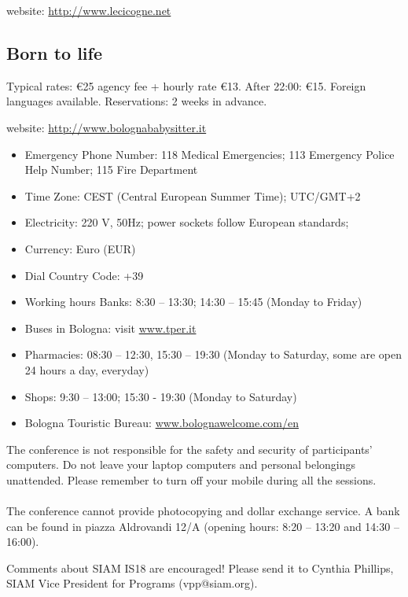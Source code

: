 \smallskip\noindent website: \href{http://www.lecicogne.net}{http://www.lecicogne.net}

\subsection*{Born to life}
Typical rates: \euro 25 agency fee + hourly rate \euro 13. After 22:00: \euro 15. Foreign languages available. Reservations: 2 weeks in advance.

\smallskip\noindent website: \href{http://www.bolognababysitter.it}{http://www.bolognababysitter.it}


\begin{itemize}
  \item Emergency Phone Number: 118 Medical Emergencies; 113 Emergency Police Help Number; 115 Fire Department 
  \item Time Zone: CEST (Central European Summer Time); UTC/GMT+2
  \item Electricity: 220 V, 50Hz; power sockets follow European standards;
  \item Currency: Euro (EUR)
  \item Dial Country Code: +39
  \item Working hours Banks: 8:30 -- 13:30; 14:30 -- 15:45 (Monday to Friday) 
  \item Buses in Bologna: visit \href{https://www.tper.it/ }{www.tper.it}
  \item Pharmacies: 08:30 -- 12:30, 15:30 -- 19:30 (Monday to Saturday, some are open 24 hours a day, everyday) 
  \item Shops: 9:30 -- 13:00; 15:30 - 19:30 (Monday to Saturday) 
  \item Bologna Touristic Bureau: \href{https://www.bolognawelcome.com/en}{www.bolognawelcome.com/en}
\end{itemize}

The conference is not responsible for the safety and security of participants' computers. 
Do not leave your laptop computers and personal belongings unattended. 
Please remember to turn off your mobile during all the sessions.\\\\ 
The conference cannot provide photocopying and dollar exchange service. 
A bank can be found in piazza Aldrovandi 12/A (opening hours: 8:20 -- 13:20 and 14:30 -- 16:00).

Comments about SIAM IS18 are encouraged! Please send it to Cynthia Phillips, SIAM Vice President for Programs (vpp@siam.org).
